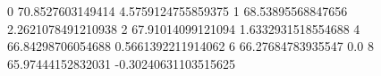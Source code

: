 0 70.8527603149414 4.5759124755859375
1 68.53895568847656 2.2621078491210938
2 67.91014099121094 1.6332931518554688
4 66.84298706054688 0.5661392211914062
6 66.27684783935547 0.0
8 65.97444152832031 -0.30240631103515625
